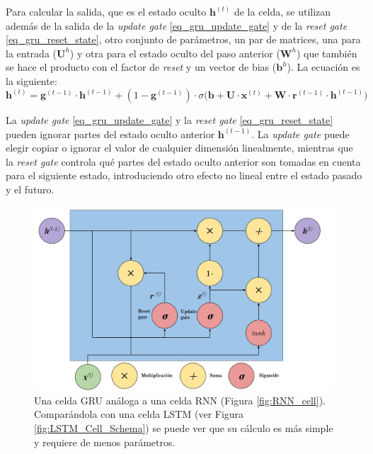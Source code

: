 \documentclass[spanish]{article}
\theoremstyle{definition}
\theoremstyle{remark}
\numberwithin{equation}{section}
\numberwithin{equation}{section} %
\begin{document}
 Para calcular la salida, que es el estado oculto $\boldsymbol{h}^{(t)}$ de la celda, se utilizan además de la salida de la \textit{update gate} \eqref{eq_gru_update_gate} y de la \textit{reset gate} \eqref{eq_gru_reset_state}, otro conjunto de parámetros, un par de matrices, una para la entrada ($\boldsymbol{U}^h$) y otra para el estado oculto del paso anterior ($\boldsymbol{W}^h$) que también se hace el producto con el factor de \textit{reset} y un vector de bias ($\boldsymbol{b}^h$). La ecuación es la siguiente:
   \begin{equation}
\label{eq_gru_hidden_gate}
 \boldsymbol{h}^{(t)}  =\boldsymbol{g}^{(t-1)} \cdot \boldsymbol{h}^{(t-1)}+ (1-\boldsymbol{g}^{(t-1)}) \cdot \sigma \Bigg(\boldsymbol{b} + \boldsymbol{U} \cdot \boldsymbol{x}^{(t)} + \boldsymbol{W} \cdot \boldsymbol{r}^{(t-1)} \cdot \boldsymbol{h}^{(t-1)}\Bigg)
 \end{equation} \par
La \textit{update gate} \eqref{eq_gru_update_gate} y la \textit{reset gate} \eqref{eq_gru_reset_state} pueden ignorar partes del estado oculto anterior $\boldsymbol{h}^{(t-1)}$. La \textit{update gate} puede elegir copiar o ignorar el valor de cualquier dimensión linealmente, mientras que la \textit{reset gate} controla qué partes del estado oculto anterior son tomadas en cuenta para el siguiente estado, introduciendo otro efecto no lineal entre el estado pasado y el futuro.   
\begin{figure}[H]
\centering
 \includegraphics[width=15cm]{img/GRU_Cell_Schema_V2.png}
\caption[Diagrama de una celda GRU]{\footnotesize{ Una celda GRU \cite{cho2014learning} análoga a una celda RNN (Figura \ref{fig:RNN_cell}). Comparándola con una celda LSTM (ver Figura \ref{fig:LSTM_Cell_Schema}) se puede ver que su cálculo es más simple y requiere de menos parámetros.  }}
\label{fig:GRU_Cell_Schema}
\end{figure}
\end{document}

